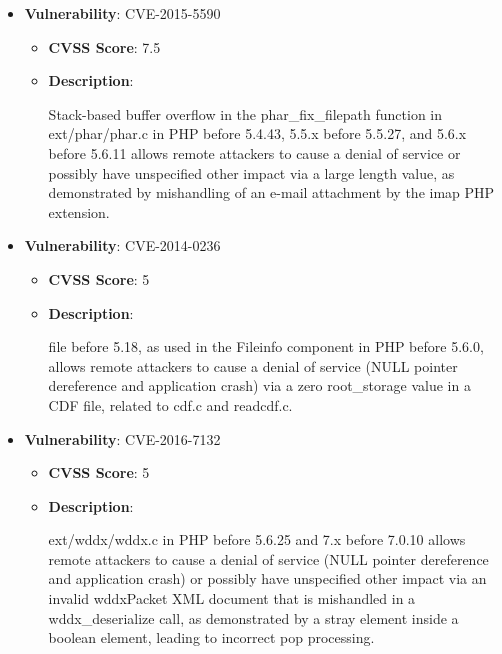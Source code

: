 \documentclass{article}
\begin{document}
\begin{itemize}
        \item \textbf{Vulnerability}: CVE-2015-5590
        \begin{itemize}
            \item \textbf{CVSS Score}:  7.5 
            \item \textbf{Description}:
            \parbox[t]{0.9\linewidth}{
                \ttfamily Stack-based buffer overflow in the phar\_fix\_filepath function in ext/phar/phar.c in PHP before 5.4.43, 5.5.x before 5.5.27, and 5.6.x before 5.6.11 allows remote attackers to cause a denial of service or possibly have unspecified other impact via a large length value, as demonstrated by mishandling of an e-mail attachment by the imap PHP extension.
            }
        \end{itemize}
    
        \item \textbf{Vulnerability}: CVE-2014-0236
        \begin{itemize}
            \item \textbf{CVSS Score}:  5 
            \item \textbf{Description}:
            \parbox[t]{0.9\linewidth}{
                \ttfamily file before 5.18, as used in the Fileinfo component in PHP before 5.6.0, allows remote attackers to cause a denial of service (NULL pointer dereference and application crash) via a zero root\_storage value in a CDF file, related to cdf.c and readcdf.c.
            }
        \end{itemize}
    
        \item \textbf{Vulnerability}: CVE-2016-7132
        \begin{itemize}
            \item \textbf{CVSS Score}:  5 
            \item \textbf{Description}:
            \parbox[t]{0.9\linewidth}{
                \ttfamily ext/wddx/wddx.c in PHP before 5.6.25 and 7.x before 7.0.10 allows remote attackers to cause a denial of service (NULL pointer dereference and application crash) or possibly have unspecified other impact via an invalid wddxPacket XML document that is mishandled in a wddx\_deserialize call, as demonstrated by a stray element inside a boolean element, leading to incorrect pop processing.
            }
        \end{itemize}
    

\end{itemize}
\end{document}
